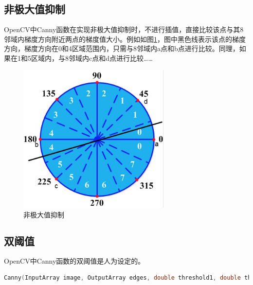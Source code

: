 \documentclass[12pt]{article}
\begin{document}
\subsection{非极大值抑制}
OpenCV中Canny函数在实现非极大值抑制时，不进行插值，直接比较该点与其8邻域内梯度方向附近两点的梯度值大小。例如如图\ref{fig:nms1}，图中黑色线表示该点的梯度方向，梯度方向在0和4区域范围内，只需与8邻域内a点和b点进行比较。同理，如果在1和5区域内，与8邻域内c点和d点进行比较……
    \begin{figure}
    \centering
    \includegraphics[width=3in]{nms1.png}
    \caption{非极大值抑制}
    \label{fig:nms1}
    \end{figure}  

\subsection{双阈值}
OpenCV中Canny函数的双阈值是人为设定的。
  \begin{lstlisting}[language=c++]
    Canny(InputArray image, OutputArray edges, double threshold1, double threshold2)
  \end{lstlisting}









\end{document}
